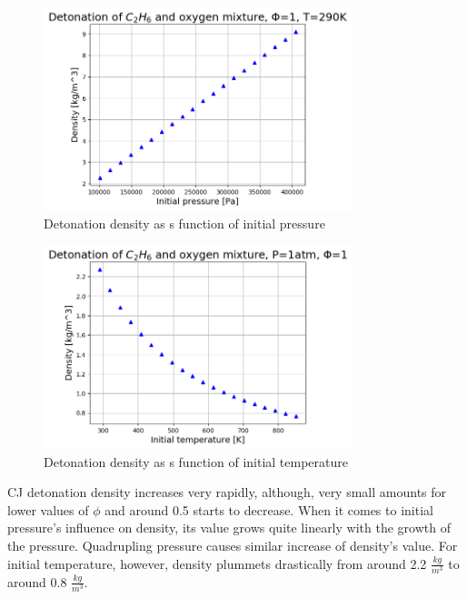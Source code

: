 \documentclass[a4paper]{article}
\begin{document}
\begin{figure}[H]
\centering
\includegraphics[width=0.8\textwidth]{density_Pi.png}
\caption{Detonation density as s function of initial pressure}
\end{figure}

\begin{figure}[H]
\centering
\includegraphics[width=0.8\textwidth]{density_Ti.png}
\caption{Detonation density as s function of initial temperature}
\end{figure}

CJ detonation density increases very rapidly, although, very small amounts for lower values of $\phi$ and around 0.5 starts to decrease. When it comes to initial pressure's influence on density, its value grows quite linearly with the growth of the pressure. Quadrupling pressure causes similar increase of density's value. For initial temperature, however, density plummets drastically from around 2.2 \( \frac{kg}{m^{3}} \) to around 0.8 \( \frac{kg}{m^{3}} \).
\end{document}
